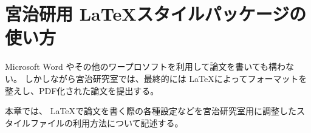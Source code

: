 \documentclass[a4paper,11pt,oneside,openany]{jsbook}
\begin{document}
\chapter{宮治研用 \LaTeX スタイルパッケージの使い方}
Microsoft Word やその他のワープロソフトを利用して論文を書いても構わない。
しかしながら宮治研究室では、最終的には \LaTeX によってフォーマットを整えし、PDF化された論文を提出する。

本章では、 \LaTeX で論文を書く際の各種設定などを宮治研究室用に調整したスタイルファイルの利用方法について記述する。





%
\end{document}
